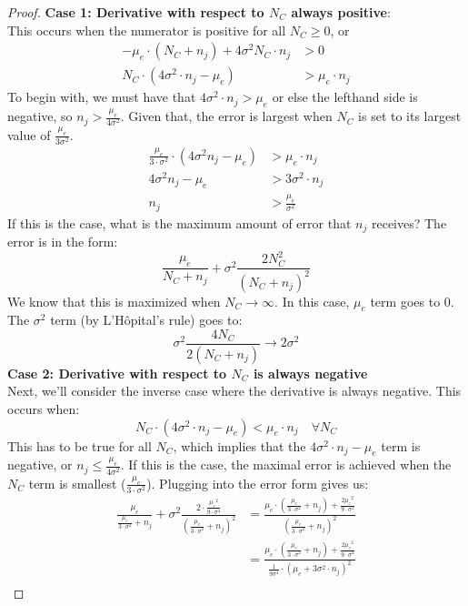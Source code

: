 \documentclass{article}
\newcommand{\p}[1]{\left( #1 \right)}
\newcommand{\cd}[0]{\cdot}
\newcommand{\mue}[0]{\ensuremath{\mu_e}}
\newcommand{\var}[0]{\ensuremath{\sigma^2}}
\newcommand{\ndraw}[0]{\ensuremath{n}}
\newcommand{\total}[0]{\ensuremath{N}}
\newcommand{\col}[0]{\ensuremath{C}}
\begin{document}
\begin{proof}
\textbf{Case 1: Derivative with respect to $\total_{\col}$ always positive}: \\
This occurs when the numerator is positive for all $\total_{\col} \geq 0$, or
\begin{align*}
- \mue \cd (\total_{\col} + \ndraw_j)+ 4\var  \total_{\col} \cd \ndraw_j &> 0 \\
\total_{\col} \cd (4 \var \cd \ndraw_j - \mue) &> \mue \cd \ndraw_j 
\end{align*}
To begin with, we must have that $4 \var \cd \ndraw_j > \mue$ or else the lefthand side is negative, so $\ndraw_j > \frac{\mue}{4 \var}$. Given that, the error is largest when $\total_{\col}$ is set to its largest value of $\frac{\mue}{3\var}$. 
\begin{align*}
\frac{\mue}{3\cd \var} \cd (4 \var \ndraw_j - \mue) &> \mue \cd \ndraw_j\\
4 \var \ndraw_j - \mue &> 3 \var \cd  \ndraw_j\\
\ndraw_j &> \frac{\mue}{\var}
\end{align*}
If this is the case, what is the maximum amount of error that $\ndraw_j$ receives? The error is in the form:
$$\frac{\mue}{\total_{\col} + \ndraw_j} + \var \frac{2\total_{\col}^2}{(\total_{\col} + \ndraw_j)^2}$$
We know that this is maximized when $\total_{\col} \rightarrow \infty$. In this case, $\mue$ term goes to 0. The $\var$ term (by L'H\^{o}pital's rule) goes to: 
$$\var \frac{4\total_{\col}}{2 (\total_{\col} + \ndraw_j)} \rightarrow  2\var  $$
\textbf{Case 2: Derivative with respect to $\total_{\col}$ is always negative} \\
Next, we'll consider the inverse case where the derivative is always negative. This occurs when: 
$$\total_{\col} \cd (4 \var \cd \ndraw_j - \mue)< \mue \cd \ndraw_j \quad  \forall \total_{\col}$$
This has to be true for all $\total_{\col}$, which implies that the $4 \var \cd \ndraw_j - \mue$ term is negative, or $\ndraw_j \leq \frac{\mue}{4\var}$. If this is the case, the maximal error is achieved when the $\total_{\col}$ term is smallest ($\frac{\mue}{3\cd  \var}$). Plugging into the error form gives us: 
\begin{align*}
\frac{\mue}{\frac{\mue}{3 \cd \var} + \ndraw_j} + \var \frac{2 \cd  \frac{\mue^2}{9\cd \sigma^4}}{\p{\frac{\mue}{3 \cd \var} + \ndraw_j}^2}&=\frac{ \mue \cd \p{\frac{\mue}{3 \cd \var} + \ndraw_j} + \frac{2 \mue^2}{9\cd \var}}{\p{\frac{\mue}{3 \cd \var} + \ndraw_j}^2} \\
&=\frac{ \mue \cd \p{\frac{\mue}{3 \cd \var} + \ndraw_j} + \frac{2 \mue^2}{9\cd \var}}{\frac{1}{9 \sigma^4}\cd \p{\mue + 3 \var \cd \ndraw_j}^2}\\

\end{align*}
\end{proof}
\end{document}
